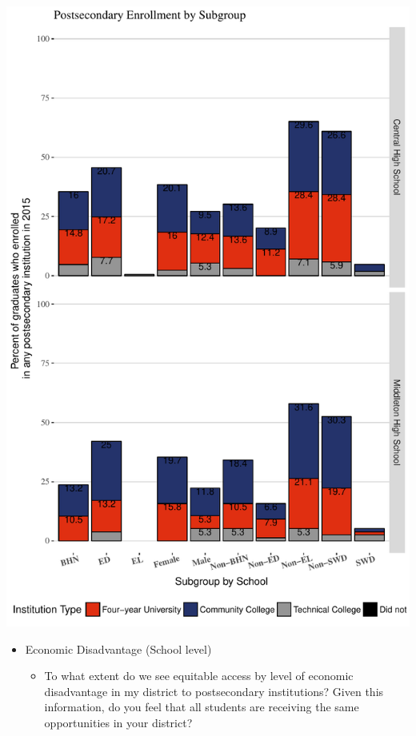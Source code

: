 \documentclass[11pt,]{article}
\providecommand{\tightlist}{%
  \setlength{\itemsep}{0pt}\setlength{\parskip}{0pt}}
\begin{document}
\begin{center}\includegraphics{20170411_PSWRR_no_CTE_files/figure-latex/subgroup Enrollment-1} \end{center}

\begin{itemize}
\tightlist
\item
  Economic Disadvantage (School level)

  \begin{itemize}
  \tightlist
  \item
    To what extent do we see equitable access by level of economic
    disadvantage in my district to postsecondary institutions? Given
    this information, do you feel that all students are receiving the
    same opportunities in your district?
  \end{itemize}
\end{itemize}
\end{document}
